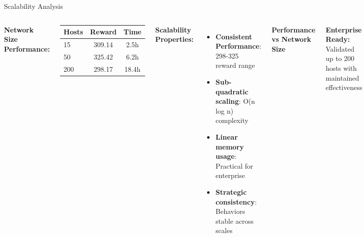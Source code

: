 \documentclass[aspectratio=169,xcolor=dvipsnames]{beamer}
\begin{document}
\begin{frame}{Scalability Analysis}
\begin{columns}[c]
\textbf{\textcolor{ImperialBlue}{Network Size Performance:}}

\begin{center}
\begin{tabular}{|l|c|c|}
\hline
\rowcolor{ImperialLightBlue}
\textbf{Hosts} & \textbf{Reward} & \textbf{Time} \\
\hline
15 & 309.14 & 2.5h \\
50 & 325.42 & 6.2h \\
200 & 298.17 & 18.4h \\
\hline
\end{tabular}
\end{center}

\textbf{\textcolor{cwDecoy}{Scalability Properties:}}
\begin{itemize}
    \item \textbf{Consistent Performance}: 298-325 reward range
    \item \textbf{Sub-quadratic scaling}: O(n log n) complexity
    \item \textbf{Linear memory usage}: Practical for enterprise
    \item \textbf{Strategic consistency}: Behaviors stable across scales
\end{itemize}

\begin{center}
\textbf{Performance vs Network Size}

\end{center}

\textbf{\textcolor{cwAlert}{Enterprise Ready:}} Validated up to 200 hosts with maintained effectiveness
\end{columns}
\end{frame}
\end{document}
